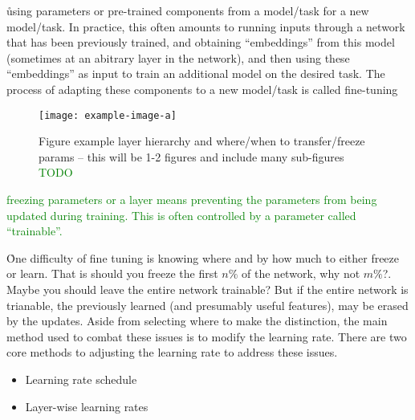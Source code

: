 
\r{using parameters or pre-trained components from a model/task for a new model/task.  In practice, this often amounts to running inputs through a network that has been previously trained, and obtaining ``embeddings'' from this model (sometimes at an abitrary layer in the network), and then using these ``embeddings'' as input to train an additional model on the desired task. The process of adapting these components to a new model/task is called fine-tuning}


\begin{figure}[htp]
	\centering
	\texttt{[image: example-image-a]}\hfil
	\caption{Figure example layer hierarchy and where/when to transfer/freeze params -- this will be 1-2 figures and include many sub-figures \textcolor{green}{TODO}}
	\label{fig:transfer_learning_subfigs_a}
\end{figure}

\textcolor{green}{{freezing} parameters or a layer means preventing the parameters from being updated during training. This is often controlled by a parameter called ``trainable''.}



\r{One difficulty of fine tuning is knowing where and by how much to either freeze or learn. That is should you freeze the first $n\%$ of the network, why not $m\%$?. Maybe you should leave the entire network trainable? But if the entire network is trianable, the previously learned (and presumably useful features), may be erased by the updates. Aside from selecting where to make the distinction, the main method used to combat these issues is to modify the learning rate. There are two core methods to adjusting the learning rate to address these issues.}

\begin{itemize}[noitemsep,topsep=0pt]
	\item Learning rate schedule
	\item Layer-wise learning rates
\end{itemize}


